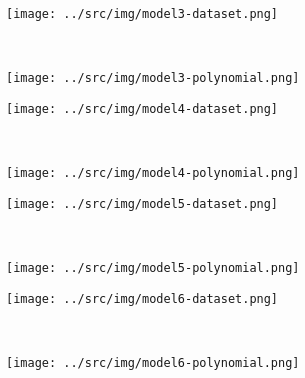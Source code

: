 \documentclass[12pt]{article}
\begin{document}
		\begin{figure}
		\begin{minipage}[c]{.5\textwidth}
			\centering
			\texttt{[image: ../src/img/model3-dataset.png]}
			\label{fig:model3-dataset}
		\end{minipage}
		~
		\begin{minipage}[c]{.5\textwidth}
			\centering
			\texttt{[image: ../src/img/model3-polynomial.png]}
			\label{fig:model3-polynomial}
		\end{minipage}
	\end{figure}

		\begin{figure}
		\begin{minipage}[c]{.5\textwidth}
			\centering
			\texttt{[image: ../src/img/model4-dataset.png]}
			\label{fig:model4-dataset}
		\end{minipage}
		~
		\begin{minipage}[c]{.5\textwidth}
			\centering
			\texttt{[image: ../src/img/model4-polynomial.png]}
			\label{fig:model4-polynomial}
		\end{minipage}
	\end{figure}

		\begin{figure}
		\begin{minipage}[c]{.5\textwidth}
			\centering
			\texttt{[image: ../src/img/model5-dataset.png]}
			\label{fig:model5-dataset}
		\end{minipage}
		~
		\begin{minipage}[c]{.5\textwidth}
			\centering
			\texttt{[image: ../src/img/model5-polynomial.png]}
			\label{fig:model5-polynomial}
		\end{minipage}
	\end{figure}

		\begin{figure}
		\begin{minipage}[c]{.5\textwidth}
			\centering
			\texttt{[image: ../src/img/model6-dataset.png]}
			\label{fig:model6-dataset}
		\end{minipage}
		~
		\begin{minipage}[c]{.5\textwidth}
			\centering
			\texttt{[image: ../src/img/model6-polynomial.png]}
			\label{fig:model6-polynomial}
		\end{minipage}
	\end{figure}
\end{document}
